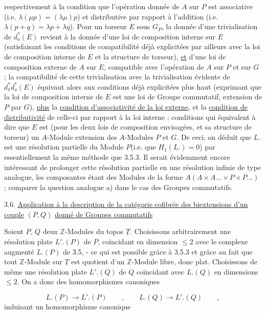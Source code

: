 respectivement à la condition que l'opération donnée de $A$ sur $P$ est associative (i.e. $\lambda(\mu p) = (\lambda\mu)p$) et distributive par rapport à l'addition (i.e. $\lambda(p+q) = \lambda p + \lambda q$). Pour un torseur $E$ sous $G_P$, la donnée d'une trivialisation de $d_o^*(E)$ revient à la donnée d'une loi de composition interne sur $E$ (satisfaisant les conditions de compatibilité déjà explicitées par ailleurs avec la loi de composition interne de $E$ et la structure de torseur), \underline{et} d'une loi de composition externe de $A$ sur $E$, compatible avec l'opération de $A$ sur $P$ et sur $G$ ; la compatibilité de cette trivialisation avec la trivialisation évidente de $d_1^* d_o^*(E)$ équivaut alors aux conditions déjà explicitées plus haut (exprimant que la loi de composition interne de $E$ est une loi de Groupe commutatif, extension de $P$ par $G$), \underline{plus} la \underline{condition d'associativité de la loi externe}, et la \underline{condition de distributivité} de celle-ci par rapport à la loi interne ; conditions qui équivalent à dire que $E$ est (pour les deux lois de composition envisagées, et sa structure de torseur) un $A$-Module extension des $A$-Modules $P$ et $G$. De ceci, on déduit que $L.$ est une résolution partielle du Module $P$(i.e. que $H_1(L.) = 0$) par essentiellement la même méthode que 3.5.3. Il serait évidemment encore intéressant de prolonger cette résolution partielle en une résolution infinie de type analogue, les composantes étant des Modules de la forme $A(A \times A \ldots \times P \times P \ldots)$ ; comparer la question analogue a) dans le cas des Groupes commutatifs.




3.6.  \underline{Application à la description de la catégorie cofibrée des biextensions d'un couple} $(P,Q)$ \underline{donné de Groupes commutatifs}

Soient $P$, $Q$ deux $\mathbb{Z}$-Modules du topos $\underline{T}$. Choisissons arbitrairement une résolution plate $L'.(P)$ de $P$, coïncidant en dimension $\leq 2$ avec le complexe augmenté $L.(P)$ de 3.5, - ce qui est possible grâce à 3.5.3 et grâce au fait que tout $\mathbb{Z}$-Module sur $\underline{T}$ est quotient d'un $\mathbb{Z}$-Module libre, donc plat. Choisissons de même une résolution plate $L'.(Q)$ de $Q$ coïncidant avec $L.(Q)$ en dimensions $\leq 2$. On a donc des homomorphismes canoniques

\begin{equation}\tag{3.6.1}
L.(P) \longrightarrow L'.(P) \qquad , \qquad L.(Q) \longrightarrow L'.(Q) \qquad ,
\end{equation}
induisant un homomorphisme canonique

